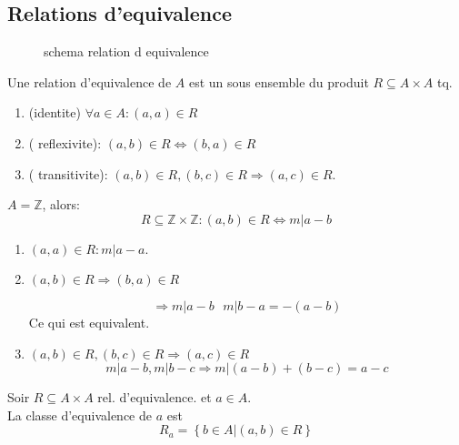 \documentclass[../main.tex]{subfiles}
\begin{document}
\subsection{Relations d'equivalence}
\begin{figure}[ht]
    \centering
    \caption{schema relation d equivalence}
    \label{fig:schema-relation-d-equivalence}
\end{figure}
\begin{defn}\label{defn:relations_d_equivalence}
	Une relation d'equivalence de $A$ est un sous ensemble du produit $R \subseteq A \times A$ tq.
	\begin{enumerate}
		\item (identite) $\forall a \in A: ( a,a) \in R	$\\
		\item ( reflexivite): $(a,b) \in R \iff ( b,a) \in R$ \\
		\item ( transitivite): $(a,b) \in R, ( b,c) \in R \Rightarrow ( a,c)\in R$.
	\end{enumerate}
\end{defn}
\begin{exemple}
$A= \mathbb{Z}$, alors:
\[ 
	R \subseteq \mathbb{Z}\times \mathbb{Z}: ( a,b) \in R \iff m \vert a-b
\]
\begin{enumerate}
	\item $(a,a) \in R: m \vert a-a$.\\
	\item $( a,b) \in R \Rightarrow ( b,a) \in R$

		\[ 
			\Rightarrow m \vert a-b \text{  } m \vert b-a = -(a-b)
		\]
	Ce qui est equivalent.\\
\item $(a,b) \in R, ( b,c) \in R \Rightarrow ( a,c) \in R$\\
	\[ 
		m \vert a-b , m | b-c \Rightarrow m \vert ( a-b)+ ( b-c) = a-c
	\]
	
\end{enumerate}
\end{exemple}
\begin{defn}\label{defn:classes_d_equivalence}
	Soir $R \subseteq A \times A$ rel. d'equivalence. et $a \in A$.\\
	La classe d'equivalence de $a$ est
	\[ 
		R_a= \left\{ b \in A \vert ( a,b) \in R \right\} 
	\]
\end{defn}
\end{document}
